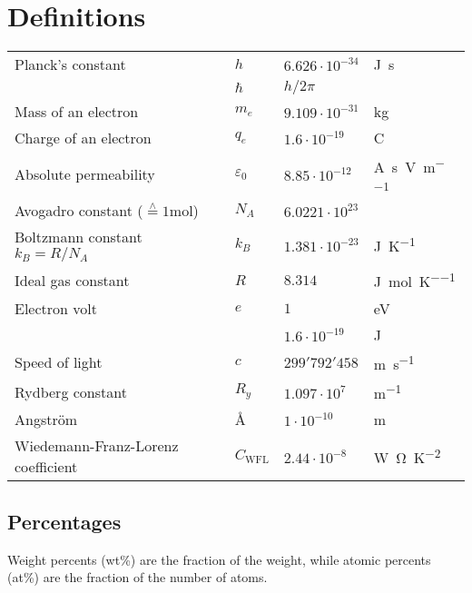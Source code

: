 \section{Definitions}

\begin{table*}[ht]
    \begin{tabularx}{\linewidth}{Xlll}
        \toprule
    	Planck's constant & $h$ & $6.626 \cdot 10^{-34}$ & \si{\J\second} \\
    		& $\hbar$ & $h / 2\pi$ & \\
    	Mass of an electron & $m_e$ &  $9.109 \cdot 10^{-31}$ & \si{\kilogram} \\
    	Charge of an electron & $q_e$ & $1.6 \cdot 10^{-19}$ & \si{\coulomb} \\
    	Absolute permeability & $\varepsilon_0$ & $8.85 \cdot 10^{-12}$ & \si{\ampere\second\per\volt\per\meter} \\
    	Avogadro constant  ($\stackrel{\wedge}{=}1$\si{\mol})& $N_A$ & $6.0221 \cdot 10^{23}$ & \\
    	Boltzmann constant $k_B = R / N_A$& $k_B$ & $1.381 \cdot10^{-23}$ & \si{\J\per\K} \\
    	Ideal gas constant & $R$ & $8.314$ & \si{\J\per\mol\per\K} \\
    	Electron volt & $e$ & $1$ & \si{\eV} \\
    		& & $1.6 \cdot 10^{-19}$ & \si{\J} \\ 
    	Speed of light & $c$ & $299'792'458$ & \si{\meter\per\second} \\
    	Rydberg constant & $R_y$ & $1.097 \cdot 10^{7}$ & \si{\meter\tothe{-1}} \\
    	Angström & \AA & $1 \cdot 10^{-10}$ & \si{\meter} \\
    	Wiedemann-Franz-Lorenz coefficient & $C_{\mathrm{WFL}}$ & $2.44 \cdot 10^{-8}$ & \si{\watt\ohm\per\square\kelvin} \\
    	\bottomrule
    \end{tabularx}
\end{table*}

\subsection{Percentages}
Weight percents (wt\%) are the fraction of the weight, while atomic percents (at\%) are the fraction of the number of atoms.